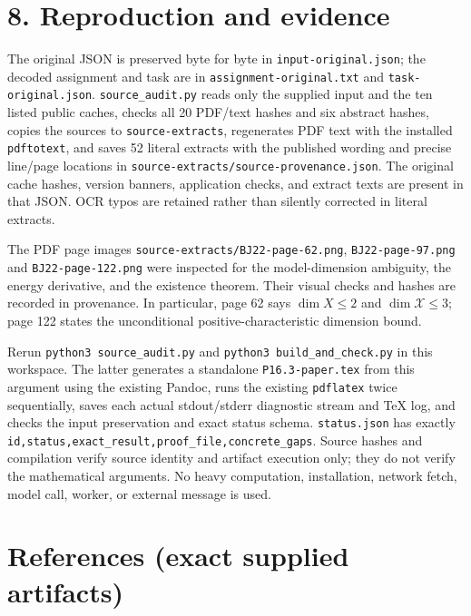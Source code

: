 \documentclass[
  11pt,
]{article}
\begin{document}
\section{8. Reproduction and evidence}\label{reproduction-and-evidence}

The original JSON is preserved byte for byte in
\texttt{input-original.json}; the decoded assignment and task are in
\texttt{assignment-original.txt} and \texttt{task-original.json}.
\texttt{source\_audit.py} reads only the supplied input and the ten
listed public caches, checks all 20 PDF/text hashes and six abstract
hashes, copies the sources to \texttt{source-extracts}, regenerates PDF
text with the installed \texttt{pdftotext}, and saves 52 literal
extracts with the published wording and precise line/page locations in
\texttt{source-extracts/source-provenance.json}. The original cache
hashes, version banners, application checks, and extract texts are
present in that JSON. OCR typos are retained rather than silently
corrected in literal extracts.

The PDF page images \texttt{source-extracts/BJ22-page-62.png},
\texttt{BJ22-page-97.png} and \texttt{BJ22-page-122.png} were inspected
for the model-dimension ambiguity, the energy derivative, and the
existence theorem. Their visual checks and hashes are recorded in
provenance. In particular, page 62 says \(\dim X\leq2\) and
\(\dim\mathcal X\leq3\); page 122 states the unconditional
positive-characteristic dimension bound.

Rerun \texttt{python3\ source\_audit.py} and
\texttt{python3\ build\_and\_check.py} in this workspace. The latter
generates a standalone \texttt{P16.3-paper.tex} from this argument using
the existing Pandoc, runs the existing \texttt{pdflatex} twice
sequentially, saves each actual stdout/stderr diagnostic stream and TeX
log, and checks the input preservation and exact status schema.
\texttt{status.json} has exactly
\texttt{id,status,exact\_result,proof\_file,concrete\_gaps}. Source
hashes and compilation verify source identity and artifact execution
only; they do not verify the mathematical arguments. No heavy
computation, installation, network fetch, model call, worker, or
external message is used.

\section{References (exact supplied
artifacts)}\label{references-exact-supplied-artifacts}
\end{document}
